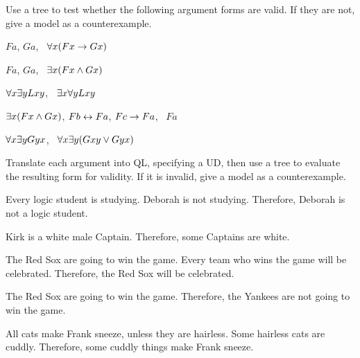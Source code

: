 \solutions
\problempart
\label{pr.QL.trees.validity}
Use a tree to test whether the following argument forms are valid. If they are not, give a model as a counterexample.
\begin{earg}
\item $Fa$, $Ga$, \therefore\ $\forall x (Fx \rightarrow Gx)$
\item $Fa$, $Ga$, \therefore\ $\exists x (Fx \wedge Gx)$
\item $\forall x \exists y Lxy$, \therefore\ $\exists x \forall y Lxy$
\item $\exists x (Fx \wedge Gx)$, $Fb \leftrightarrow Fa$, $Fc \rightarrow Fa$, \therefore\ $Fa$
\item $\forall x \exists y Gyx$, \therefore\ $\forall x \exists y (Gxy \vee Gyx)$
\end{earg}

\problempart
\label{pr.QL.trees.translation.and.validity}
Translate each argument into QL, specifying a UD, then use a tree to evaluate the resulting form for validity. If it is invalid, give a model as a counterexample.
\begin{earg}
\item Every logic student is studying. Deborah is not studying. Therefore, Deborah is not a logic student.
\item Kirk is a white male Captain. Therefore, some Captains are white.
\item The Red Sox are going to win the game. Every team who wins the game will be celebrated. Therefore, the Red Sox will be celebrated.
\item The Red Sox are going to win the game. Therefore, the Yankees are not going to win the game.
\item All cats make Frank sneeze, unless they are hairless. Some hairless cats are cuddly. Therefore, some cuddly things make Frank sneeze.
\end{earg}

\fi

